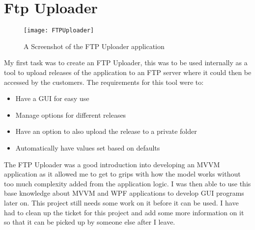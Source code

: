 \section{Ftp Uploader}{
	\begin{figure}
		\centering
		\texttt{[image: FTPUploader]}
		\caption{A Screenshot of the FTP Uploader application}
		\label{fig:FtpUploader}
	\end{figure}
	My first task was to create an FTP Uploader, this was to be used internally as a tool to upload releases of the application to an FTP server where it could then be accessed by the customers. The requirements for this tool were to:
	\begin{itemize}
		\item{Have a GUI for easy use}
		\item{Manage options for different releases}
		\item{Have an option to also upload the release to a private folder}
		\item{Automatically have values set based on defaults}
	\end{itemize} 
	The FTP Uploader was a good introduction into developing an MVVM application as it allowed me to get to grips with how the model works without too much complexity added from the application logic. I was then able to use this base knowledge about MVVM and WPF applications to develop GUI programs later on. This project still needs some work on it before it can be used. I have had to clean up the ticket for this project and add some more information on it so that it can be picked up by someone else after I leave.
}